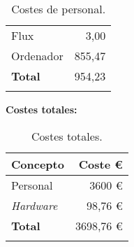 \begin{longtable}[]{@{}lr@{}}
\begin{minipage}[t]{0.38\columnwidth}
Flux\strut
\end{minipage} & \begin{minipage}[t]{0.20\columnwidth}\raggedleft\strut
3,00\strut
\end{minipage}\tabularnewline
\begin{minipage}[t]{0.38\columnwidth}\raggedright\strut
Ordenador\strut
\end{minipage} & \begin{minipage}[t]{0.20\columnwidth}\raggedleft\strut
855,47\strut
\end{minipage}\tabularnewline
\midrule
\begin{minipage}[t]{0.38\columnwidth}\raggedright\strut
\textbf{Total}\strut
\end{minipage} & \begin{minipage}[t]{0.20\columnwidth}\raggedleft\strut
954,23\strut
\end{minipage}\tabularnewline
\bottomrule
\caption{Costes de personal.}
\end{longtable}



\textbf{Costes totales:}

\begin{longtable}[]{@{}lr@{}}
\toprule
\begin{minipage}[b]{0.38\columnwidth}\raggedright\strut
\textbf{Concepto}\strut
\end{minipage} & \begin{minipage}[b]{0.20\columnwidth}\raggedleft\strut
\textbf{Coste \euro{}}\strut
\end{minipage}\tabularnewline
\midrule
\endhead
\begin{minipage}[t]{0.38\columnwidth}\raggedright\strut
Personal\strut
\end{minipage} & \begin{minipage}[t]{0.20\columnwidth}\raggedleft\strut
3600 \euro{}\strut
\end{minipage}\tabularnewline
\begin{minipage}[t]{0.38\columnwidth}\raggedright\strut
\emph{Hardware}\strut
\end{minipage} & \begin{minipage}[t]{0.20\columnwidth}\raggedleft\strut
98,76 \euro{}\strut
\end{minipage}\tabularnewline
\midrule
\begin{minipage}[t]{0.38\columnwidth}\raggedright\strut
\textbf{Total}\strut
\end{minipage} & \begin{minipage}[t]{0.20\columnwidth}\raggedleft\strut
3698,76 \euro{}\strut
\end{minipage}\tabularnewline
\bottomrule
\caption{Costes totales.}
\end{longtable}

